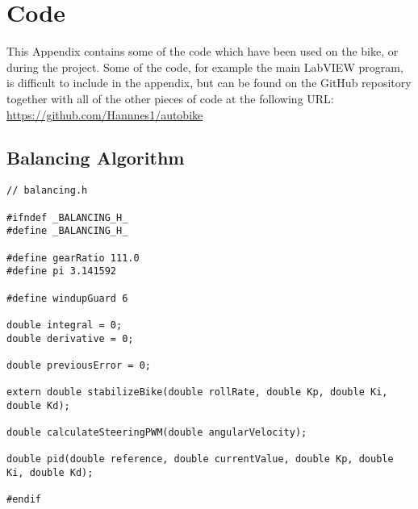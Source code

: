 \chapter{Code} \label{code}

This Appendix contains some of the code which have been used on the bike, or during the project. Some of the code, for example the main LabVIEW program, is difficult to include in the appendix, but can be found on the GitHub repository together with all of the other pieces of code at the following URL: \url{https://github.com/Hannnes1/autobike}

\section{Balancing Algorithm} \label{code:balancing}


\begin{lstlisting}
// balancing.h

#ifndef _BALANCING_H_
#define _BALANCING_H_

#define gearRatio 111.0
#define pi 3.141592

#define windupGuard 6

double integral = 0;
double derivative = 0;

double previousError = 0;

extern double stabilizeBike(double rollRate, double Kp, double Ki, double Kd);

double calculateSteeringPWM(double angularVelocity);

double pid(double reference, double currentValue, double Kp, double Ki, double Kd);

#endif
\end{lstlisting}

\newpage

